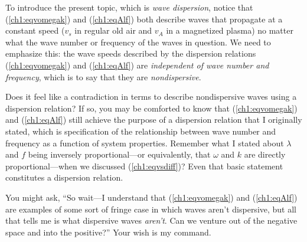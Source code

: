 To introduce the present topic, which is \emph{wave dispersion}, notice that
(\ref{ch1:eqvomegak}) and (\ref{ch1:eqAlf}) both describe waves that propagate
at a constant speed ($v_s$ in regular old air and $v_A$ in a magnetized plasma)
no matter what the wave number or frequency of the waves in question. We need to
emphasize this: the wave speeds described by the dispersion relations
(\ref{ch1:eqvomegak}) and (\ref{ch1:eqAlf}) are \emph{independent of wave number
  and frequency}, which is to say that they are \emph{nondispersive}. 

Does it feel like a contradiction in terms to describe nondispersive waves using
a dispersion relation? If so, you may be comforted to know that
(\ref{ch1:eqvomegak}) and (\ref{ch1:eqAlf}) still achieve the purpose of a
dispersion relation that I originally stated, which is specification of the
relationship between wave number and frequency as a function of system
properties. Remember what I stated about $\lambda$ and $f$ being inversely
proportional---or equivalently, that $\omega$ and $k$ are directly
proportional---when we discussed (\ref{ch1:eqvsdiff})? Even that basic statement
constitutes a dispersion relation.

You might ask, ``So wait---I understand that (\ref{ch1:eqvomegak}) and
(\ref{ch1:eqAlf}) are examples of some sort of fringe case in which waves aren't
dispersive, but all that tells me is what dispersive waves \emph{aren't}. Can we
venture out of the negative space and into the positive?'' Your wish is my
command.

